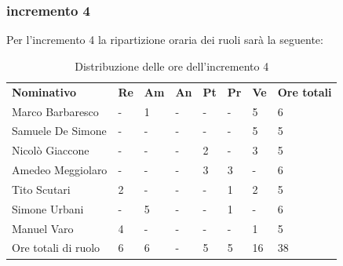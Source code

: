 \subsubsection{incremento 4}
Per l'incremento 4 la ripartizione oraria dei ruoli sarà la seguente:
\begin{center}
    \begin{table}[ht!]
        \centering
        \caption{Distribuzione delle ore dell'incremento 4}
        \vspace{5px}
        \renewcommand{\arraystretch}{1.8}
        \begin{tabular}{p{100px} p{20px} p{20px} p{20px} p{20px} p{20px} p{20px} p{50px} }
            \rowcolor{logo!70} \textbf{Nominativo} & \textbf{Re} & \textbf{Am} & \textbf{An} & \textbf{Pt} & \textbf{Pr} & \textbf{Ve} & \textbf{Ore totali} \\
            Marco Barbaresco                       & -           & 1           & -           & -           & -           & 5           & 6                   \\
            Samuele De Simone                      & -           & -           & -           & -           & -           & 5           & 5                   \\
            Nicolò Giaccone                        & -           & -           & -           & 2           & -           & 3           & 5                   \\
            Amedeo Meggiolaro                      & -           & -           & -           & 3           & 3           & -           & 6                   \\
            Tito Scutari                           & 2           & -           & -           & -           & 1           & 2           & 5                   \\
            Simone Urbani                          & -           & 5           & -           & -           & 1           & -           & 6                   \\
            Manuel Varo                            & 4           & -           & -           & -           & -           & 1           & 5                   \\
            Ore totali di ruolo                    & 6           & 6           & -           & 5           & 5          & 16           & 38                  \\
        \end{tabular}
    \end{table}
\end{center}
